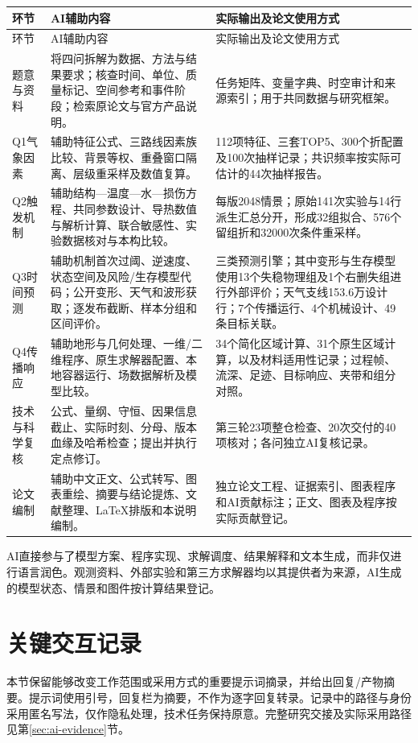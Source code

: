 \documentclass[UTF8,a4paper,zihao=-4,fontset=none]{ctexart}
\begin{document}
\begingroup\small
\begin{longtable}{p{2.0cm}p{5.7cm}p{5.9cm}}
\toprule 环节 & AI辅助内容 & 实际输出及论文使用方式 \\
\midrule\endfirsthead
\toprule 环节 & AI辅助内容 & 实际输出及论文使用方式 \\
\midrule\endhead
题意与资料 & 将四问拆解为数据、方法与结果要求；核查时间、单位、质量标记、空间参考和事件阶段；检索原论文与官方产品说明。 & 任务矩阵、变量字典、时空审计和来源索引；用于共同数据与研究框架。 \\
Q1气象因素 & 辅助特征公式、三路线因素族比较、背景等权、重叠窗口隔离、层级重采样及数值复算。 & 112项特征、三套TOP5、300个折配置及100次抽样记录；共识频率按实际可估计的44次抽样报告。 \\
Q2触发机制 & 辅助结构—温度—水—损伤方程、共同参数设计、导热数值与解析计算、联合敏感性、实验数据核对与本构比较。 & 每版2048情景；原始141次实验与14行派生汇总分开，形成32组拟合、576个留组折和32000次条件重采样。 \\
Q3时间预测 & 辅助机制首次过阈、逆速度、状态空间及风险/生存模型代码；公开变形、天气和波形获取；逐发布截断、样本分组和区间评价。 & 三类预测引擎；其中变形与生存模型使用13个失稳物理组及1个右删失组进行外部评价；天气支线153.6万设计行；7个传播运行、4个机械设计、49条目标关联。 \\
Q4传播响应 & 辅助地形与几何处理、一维/二维程序、原生求解器配置、本地容器运行、场数据解析及模型比较。 & 34个简化区域计算、31个原生区域计算，以及材料适用性记录；过程帧、流深、足迹、目标响应、夹带和组分对照。 \\
技术与科学复核 & 公式、量纲、守恒、因果信息截止、实际时刻、分母、版本血缘及哈希检查；提出并执行定点修订。 & 第三轮23项整仓检查、20次交付的40项核对；各问独立AI复核记录。 \\
论文编制 & 辅助中文正文、公式转写、图表重绘、摘要与结论提炼、文献整理、LaTeX排版和本说明编制。 & 独立论文工程、证据索引、图表程序和AI贡献标注；正文、图表及程序按实际贡献登记。 \\
\bottomrule
\end{longtable}
\endgroup

AI直接参与了模型方案、程序实现、求解调度、结果解释和文本生成，而非仅进行语言润色。观测资料、外部实验和第三方求解器均以其提供者为来源，AI生成的模型状态、情景和图件按计算结果登记。

\section{关键交互记录}
本节保留能够改变工作范围或采用方式的重要提示词摘录，并给出回复/产物摘要。提示词使用引号，回复栏为摘要，不作为逐字回复转录。记录中的路径与身份采用匿名写法，仅作隐私处理，技术任务保持原意。完整研究交接及实际采用路径见第\ref{sec:ai-evidence}节。
\end{document}
